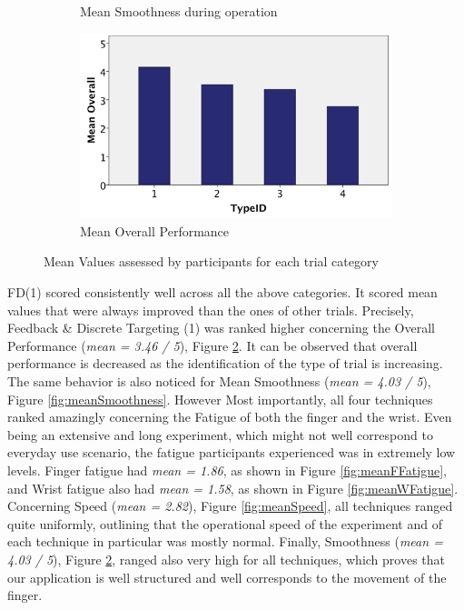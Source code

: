 \begin{figure}[h]
\begin{subfigure}[b]{0.4\textwidth}
        \caption{Mean Smoothness during operation}
        \label{fig:meanGComfort}
    \end{subfigure}
    \hfill
    \begin{subfigure}[b]{0.4\textwidth}
        \centering
        \includegraphics[width=\textwidth]{figures/meanOverall}
        \caption{Mean Overall Performance}
        \label{fig:meanOverall}
    \end{subfigure}
    \caption{Mean Values assessed by participants for each trial category}
    \label{fig:meanQuestGraphs}
\end{figure}

FD(1) scored consistently well across all the above categories. It scored mean values that were always improved than the ones of other trials. 
Precisely, Feedback \& Discrete Targeting (1) was ranked higher concerning the Overall Performance (\emph{mean = 3.46 / 5}), Figure \ref{fig:meanOverall}. It can be observed that overall performance is decreased as the identification of the type of trial is increasing. The same behavior is also noticed for Mean Smoothness (\emph{mean = 4.03 / 5}), Figure \ref{fig:meanSmoothness}. However Most importantly, all four techniques ranked amazingly concerning the Fatigue of both the finger and the wrist. Even being an extensive and long experiment, which might not well correspond to everyday use scenario,  the fatigue  participants experienced was in extremely low levels. Finger fatigue had \emph{mean = 1.86}, as shown in Figure \ref{fig:meanFFatigue}, and Wrist fatigue also had \emph{mean = 1.58}, as shown in Figure \ref{fig:meanWFatigue}. Concerning Speed (\emph{mean = 2.82}), Figure \ref{fig:meanSpeed}, all techniques ranged quite uniformly, outlining that the operational speed of the experiment and of each technique in particular was mostly normal. Finally, Smoothness (\emph{mean = 4.03 / 5}), Figure \ref{fig:meanOverall}, ranged also very high for all techniques, which proves that our application is well structured and well corresponds to the movement of the finger.




